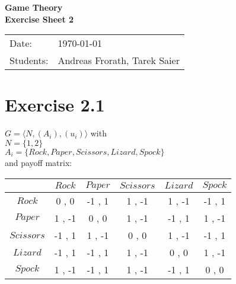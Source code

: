 \documentclass[11pt,a4paper]{article}
\newcommand{\sheetNr}{2}
\begin{document}
\begin{center}
\Huge{\textbf{Game Theory}}\\
\LARGE{\textbf{Exercise Sheet \sheetNr}}
\end{center}
\vspace{2cm}
\begin{tabular}{ll}
Date: & \today\\
Students: & Andreas Frorath, Tarek Saier
\end{tabular}

\section*{Exercise 2.1}
$G=\langle N, (A_i), (u_i)\rangle$ with\\
$N=\{1,2\}$\\
$A_i=\{Rock,Paper,Scissors,Lizard,Spock\}$\\
and payoff matrix:\\
\begin{tabular}{c|c|c|c|c|c|}
  & $Rock$ & $Paper$ & $Scissors$ & $Lizard$ & $Spock$ \\
\hline
$Rock$ & 0 , 0 & -1 , 1 & 1 , -1 & 1 , -1 & -1 , 1 \\
\hline
$Paper$ & 1 , -1 & 0 , 0 & 1 , -1 & -1 , 1 & 1 , -1 \\
\hline
$Scissors$ & -1 , 1 & 1 , -1 & 0 , 0 & 1 , -1 & -1 , 1 \\
\hline
$Lizard$ & -1 , 1 & -1 , 1 & 1 , -1 & 0 , 0 & 1 , -1 \\
\hline
$Spock$ & 1 , -1 & -1 , 1 & 1 , -1 & -1 , 1 & 0 , 0 \\
\hline
\end{tabular}
\end{document}
